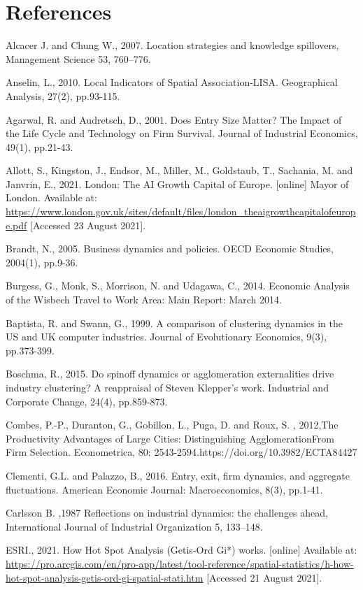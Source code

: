\documentclass[
  12pt,
  oneside]{book}
\begin{document}
\hypertarget{references}{%
\chapter*{References}\label{references}}

Alcacer J. and Chung W., 2007. Location strategies and knowledge spillovers, Management Science 53, 760--776.

Anselin, L., 2010. Local Indicators of Spatial Association-LISA. Geographical Analysis, 27(2), pp.93-115.

Agarwal, R. and Audretsch, D., 2001. Does Entry Size Matter? The Impact of the Life Cycle and Technology on Firm Survival. Journal of Industrial Economics, 49(1), pp.21-43.

Allott, S., Kingston, J., Endsor, M., Miller, M., Goldstaub, T., Sachania, M. and Janvrin, E., 2021. London: The AI Growth Capital of Europe. {[}online{]} Mayor of London. Available at: \url{https://www.london.gov.uk/sites/default/files/london_theaigrowthcapitalofeurope.pdf} {[}Accessed 23 August 2021{]}.

Brandt, N., 2005. Business dynamics and policies. OECD Economic Studies, 2004(1), pp.9-36.

Burgess, G., Monk, S., Morrison, N. and Udagawa, C., 2014. Economic Analysis of the Wisbech Travel to Work Area: Main Report: March 2014.

Baptista, R. and Swann, G., 1999. A comparison of clustering dynamics in the US and UK computer industries. Journal of Evolutionary Economics, 9(3), pp.373-399.

Boschma, R., 2015. Do spinoff dynamics or agglomeration externalities drive industry clustering? A reappraisal of Steven Klepper's work. Industrial and Corporate Change, 24(4), pp.859-873.

Combes, P.-P., Duranton, G., Gobillon, L., Puga, D. and Roux, S. , 2012,The Productivity Advantages of Large Cities: Distinguishing AgglomerationFrom Firm Selection. Econometrica, 80: 2543-2594.https://doi.org/10.3982/ECTA84427

Clementi, G.L. and Palazzo, B., 2016. Entry, exit, firm dynamics, and aggregate fluctuations. American Economic Journal: Macroeconomics, 8(3), pp.1-41.

Carlsson B. ,1987 Reflections on industrial dynamics: the challenges ahead, International Journal of Industrial Organization 5,
133--148.

ESRI., 2021. How Hot Spot Analysis (Getis-Ord Gi*) works. {[}online{]} Available at: \url{https://pro.arcgis.com/en/pro-app/latest/tool-reference/spatial-statistics/h-how-hot-spot-analysis-getis-ord-gi-spatial-stati.htm} {[}Accessed 21 August 2021{]}.
\end{document}
